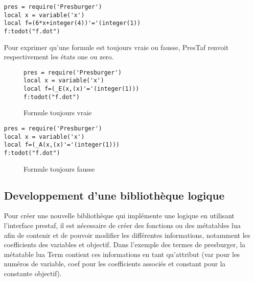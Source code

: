 \begin{lstlisting}[mathescape=true, frame=single]
pres = require('Presburger')
local x = variable('x')
local f=(6*x+integer(4))'='(integer(1))
f:todot("f.dot")
\end{lstlisting}

Pour exprimer qu'une formule est toujours vraie ou fausse, PresTaf renvoit respectivement les états one ou zero.
\begin{figure}[h]
\begin{lstlisting}[mathescape=true, frame=single]
pres = require('Presburger')
local x = variable('x')
local f=(_E(x,(x)'='(integer(1)))
f:todot("f.dot")
\end{lstlisting}

\caption{Formule toujours vraie}
\end{figure}


\begin{lstlisting}[mathescape=true, frame=single]
pres = require('Presburger')
local x = variable('x')
local f=(_A(x,(x)'='(integer(1)))
f:todot("f.dot")
\end{lstlisting}

\begin{figure}[h]
\caption{Formule toujours fausse}
\end{figure}

\subsection{ Developpement d’une bibliothèque logique}

Pour créer une nouvelle bibliothèque qui implémente une logique en utilisant l’interface prestaf, il est nécessaire de créer des fonctions ou des métatables lua afin de contenir et de pouvoir modifier les différentes informations, notamment les coefficients des variables et objectif. Dans l’exemple des termes de presburger, la métatable lua Term contient ces informations en tant qu’attribut (var pour les numéros de variable, coef pour les coefficients associés et constant pour la constante objectif).\par

